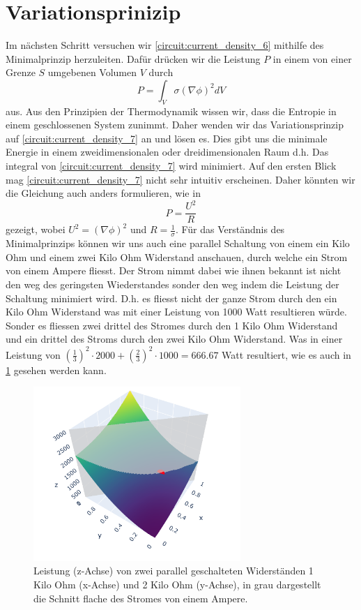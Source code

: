 \section{Variationsprinizip}
Im nächsten Schritt versuchen wir \eqref{circuit:current_density_6} mithilfe des Minimalprinzip herzuleiten. Dafür drücken wir die Leistung $P$ in einem von einer Grenze $S$ umgebenen Volumen $V$ durch 
\begin{equation}
	P=\int_V \sigma(\nabla \phi)^2 d V
	\label{circuit:current_density_7}
\end{equation}
aus. Aus den Prinzipien der Thermodynamik wissen wir, dass die Entropie in einem geschlossenen System zunimmt. Daher wenden wir das Variationsprinzip auf \eqref{circuit:current_density_7} an und lösen es. Dies gibt uns die minimale Energie in einem zweidimensionalen oder dreidimensionalen Raum d.h. Das integral von \eqref{circuit:current_density_7} wird minimiert. Auf den ersten Blick mag \eqref{circuit:current_density_7} nicht sehr intuitiv erscheinen. Daher könnten wir die Gleichung auch anders formulieren, wie in 
\begin{equation}
	P=\frac{U^2}{R}
	\label{circuit:current_density_8}
\end{equation}
gezeigt, wobei $U^2=\left( \nabla \phi \right)^2$ und $R=\frac{1}{\sigma}$.
Für das Verständnis des Minimalprinzips können wir uns auch eine parallel Schaltung von einem ein Kilo Ohm und einem zwei Kilo Ohm Widerstand anschauen, durch welche ein Strom von einem Ampere fliesst. Der Strom nimmt dabei wie ihnen bekannt ist nicht den weg des geringsten Wiederstandes sonder den weg indem die Leistung der Schaltung minimiert wird. D.h. es fliesst nicht der ganze Strom durch den ein Kilo Ohm Widerstand was mit einer Leistung von 1000 Watt resultieren würde. Sonder es fliessen zwei drittel des Stromes durch den 1 Kilo Ohm Widerstand und ein drittel des Stroms durch den zwei Kilo Ohm Widerstand. Was in einer Leistung von $(\frac{1}{3})^2\cdot 2000+(\frac{2}{3})^2\cdot 1000 = 666.67$ Watt resultiert, wie es auch in \ref{fig:circuit_power} gesehen werden kann.
\begin{figure}
	\centering
	\includegraphics[width=0.7\textwidth]{papers/circuit/two_parrallel_resistors.png}
	\caption{Leistung (z-Achse) von zwei parallel geschalteten Widerständen 1 Kilo Ohm (x-Achse) und 2 Kilo Ohm (y-Achse), in grau dargestellt die Schnitt flache des Stromes von einem Ampere.}
	\label{fig:circuit_power}
\end{figure}

